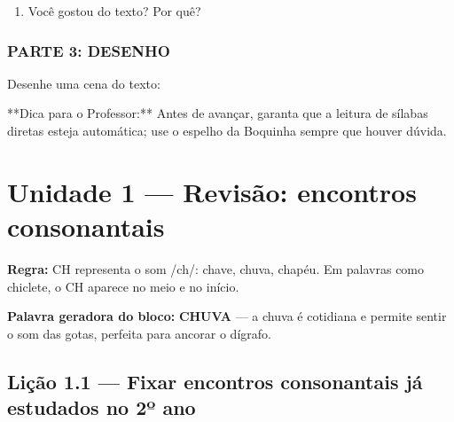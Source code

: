 \begin{exercicio}
\begin{enumerate}
  \item Você gostou do texto? Por quê?
  \begin{center}
  \underline{\hspace{12cm}}
  \end{center}

\end{enumerate}

\subsection*{PARTE 3: DESENHO}

Desenhe uma cena do texto:

\begin{center}
\end{center}

\end{exercicio}

\begin{dica}
**Dica para o Professor:** Antes de avançar, garanta que a leitura de sílabas diretas esteja automática; use o espelho da Boquinha sempre que houver dúvida.
\end{dica}


\chapter{Unidade 1 --- Revisão: encontros consonantais}


\textbf{Regra:} CH representa o som /ch/: chave, chuva, chapéu. Em palavras como chiclete, o CH aparece no meio e no início.

\textbf{Palavra geradora do bloco:} \textbf{CHUVA} --- a chuva é cotidiana e permite sentir o som das gotas, perfeita para ancorar o dígrafo.

\section{Lição 1.1 --- Fixar encontros consonantais já estudados no 2º ano}

